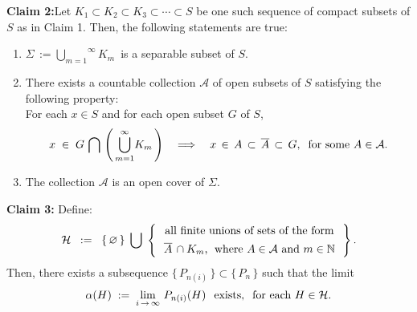 \vskip 0.5cm
\begin{center}
\begin{minipage}{6.5in}
\textbf{Claim 2:}\quad Let  $K_{1} \subset K_{2} \subset K_{3} \subset \cdots \subset S$
be one such sequence of compact subsets of $S$ as in Claim 1.
Then, the following statements are true:
\begin{enumerate}
\item	$\Sigma \,:= \overset{\infty}{\underset{m=1}{\bigcup}}K_{m}$\, is a separable subset of $S$.
\item	There exists a countable collection $\mathcal{A}$ of open subsets of $S$ satisfying
		the following property: \\
		For each $x \in S$ and for each open subset $G$ of $S$,
		\begin{equation*}
		x \; \in \; G\,\bigcap\,\left(\,\overset{\infty}{\underset{m=1}{\bigcup}}K_{m}\,\right)
		\quad
		\Longrightarrow
		\quad
		x \,\in\, A \,\subset\, \overline{A} \,\subset\, G,
		\;\;\textnormal{for some $A \in \mathcal{A}$}.
		\end{equation*}
\item	The collection $\mathcal{A}$ is an open cover of $\Sigma$.
\end{enumerate}
\end{minipage}
\end{center}

\vskip 0.5cm
\begin{center}
\begin{minipage}{6.5in}
\textbf{Claim 3:}\quad
Define:
\begin{equation*}
\mathcal{H}
\;\; := \;\;
\left\{\,\varemptyset\,\right\}
\;\bigcup\;
\left\{\,
\begin{array}{c}
\textnormal{all finite unions of sets of the form}
\\
\textnormal{$\overline{A}\,\overset{{\color{white}1}}{\cap}K_{m}$, \;where $A \in \mathcal{A}$ and $m \in \N$}
\end{array}
\,\right\}.
\end{equation*}
Then, there exists a subsequence $\{\,P_{n(i)}\,\} \subset \{\,P_{n}\,\}$ such that the limit
\begin{equation*}
\alpha(H) \; := \;
\lim_{i\,\rightarrow\,\infty}\,P_{n(i)}(H) \;\;\,\textnormal{exists},
\;\;
\textnormal{for each $H \in \mathcal{H}$}.
\end{equation*}
\end{minipage}
\end{center}

